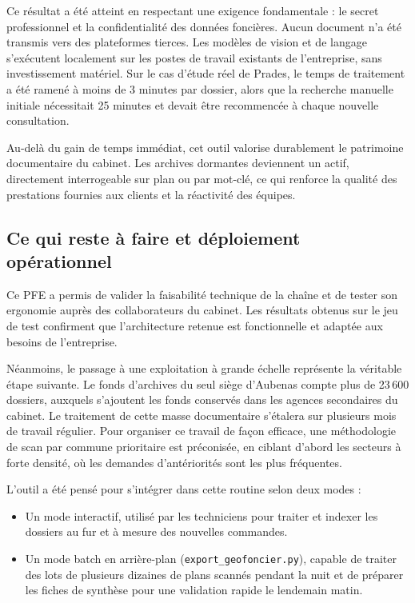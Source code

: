 Ce résultat a été atteint en respectant une exigence fondamentale : le secret professionnel et la confidentialité des données foncières. Aucun document n'a été transmis vers des plateformes tierces. Les modèles de vision et de langage s'exécutent localement sur les postes de travail existants de l'entreprise, sans investissement matériel. Sur le cas d'étude réel de Prades, le temps de traitement a été ramené à moins de 3 minutes par dossier, alors que la recherche manuelle initiale nécessitait 25 minutes et devait être recommencée à chaque nouvelle consultation.

Au-delà du gain de temps immédiat, cet outil valorise durablement le patrimoine documentaire du cabinet. Les archives dormantes deviennent un actif, directement interrogeable sur plan ou par mot-clé, ce qui renforce la qualité des prestations fournies aux clients et la réactivité des équipes.


\subsection{Ce qui reste à faire et déploiement opérationnel}

Ce PFE a permis de valider la faisabilité technique de la chaîne et de tester son ergonomie auprès des collaborateurs du cabinet. Les résultats obtenus sur le jeu de test confirment que l'architecture retenue est fonctionnelle et adaptée aux besoins de l'entreprise.

Néanmoins, le passage à une exploitation à grande échelle représente la véritable étape suivante. Le fonds d'archives du seul siège d'Aubenas compte plus de 23\,600 dossiers, auxquels s'ajoutent les fonds conservés dans les agences secondaires du cabinet. Le traitement de cette masse documentaire s'étalera sur plusieurs mois de travail régulier. Pour organiser ce travail de façon efficace, une méthodologie de scan par commune prioritaire est préconisée, en ciblant d'abord les secteurs à forte densité, où les demandes d'antériorités sont les plus fréquentes.

L'outil a été pensé pour s'intégrer dans cette routine selon deux modes :
\begin{itemize}
  \item Un mode interactif, utilisé par les techniciens pour traiter et indexer les dossiers au fur et à mesure des nouvelles commandes.
  \item Un mode batch en arrière-plan (\texttt{export\_geofoncier.py}), capable de traiter des lots de plusieurs dizaines de plans scannés pendant la nuit et de préparer les fiches de synthèse pour une validation rapide le lendemain matin.
\end{itemize}

